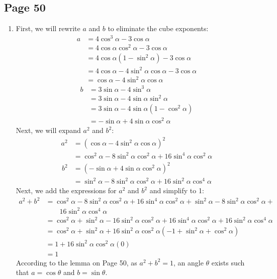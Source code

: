 \documentclass{article}
\newenvironment{solutions}[1]
{\subsection*{#1}
 \begin{enumerate}[leftmargin=1.5em]}
{\end{enumerate}}
\newcommand{\solution}{\item}
\begin{document}
\begin{solutions}{Page 50}
\solution %
First, we will rewrite $a$ and $b$ to eliminate the cube exponents:
\begin{align*}
a &= 4\cos^{3}{\alpha} - 3\cos{\alpha} \\
&= 4\cos{\alpha}\cos^{2}{\alpha} - 3\cos{\alpha} \\
&= 4\cos{\alpha}(1 - \sin^{2}{\alpha}) - 3\cos{\alpha} \\
&= 4\cos{\alpha} - 4\sin^{2}{\alpha}\cos{\alpha} - 3\cos{\alpha} \\
&= \cos{\alpha} - 4\sin^{2}{\alpha}\cos{\alpha}
\end{align*}
\begin{align*}
b &= 3\sin{\alpha} - 4\sin^{3}{\alpha} \\
&= 3\sin{\alpha} - 4\sin{\alpha}\sin^{2}{\alpha} \\
&= 3\sin{\alpha} - 4\sin{\alpha}(1 - \cos^{2}{\alpha}) \\
&= -\sin{\alpha} + 4\sin{\alpha}\cos^{2}{\alpha}
\end{align*}
Next, we will expand $a^2$ and $b^2$:
\begin{align*}
a^2 &= (\cos{\alpha} - 4\sin^{2}{\alpha}\cos{\alpha})^2 \\
&= \cos^{2}{\alpha} - 8\sin^{2}{\alpha}\cos^{2}{\alpha} + 16\sin^{4}{\alpha}\cos^{2}{\alpha}
\end{align*}
\begin{align*}
b^2 &= (-\sin{\alpha} + 4\sin{\alpha}\cos^{2}{\alpha})^2 \\
&= \sin^{2}{\alpha} - 8\sin^{2}{\alpha}\cos^{2}{\alpha} + 16\sin^{2}{\alpha}\cos^{4}{\alpha}
\end{align*}
Next, we add the expressions for $a^2$ and $b^2$ and simplify to 1:
\begin{align*}
a^2 + b^2 &= \cos^{2}{\alpha} - 8\sin^{2}{\alpha}\cos^{2}{\alpha} + 16\sin^{4}{\alpha}\cos^{2}{\alpha} +\sin^{2}{\alpha} - 8\sin^{2}{\alpha}\cos^{2}{\alpha} + \\
&\quad\quad16\sin^{2}{\alpha}\cos^{4}{\alpha} \\
&= \cos^{2}{\alpha} + \sin^{2}{\alpha} - 16\sin^{2}{\alpha}\cos^{2}{\alpha} + 16\sin^{4}{\alpha}\cos^{2}{\alpha} + 16\sin^{2}{\alpha}\cos^{4}{\alpha} \\
&= \cos^{2}{\alpha} + \sin^{2}{\alpha} + 16\sin^{2}{\alpha}\cos^{2}{\alpha}(-1 + \sin^{2}{\alpha} + \cos^{2}{\alpha}) \\
&= 1 + 16\sin^{2}{\alpha}\cos^{2}{\alpha}(0) \\
&= 1
\end{align*}
According to the lemma on Page 50, as $a^2 + b^2 = 1$, an angle $\theta$ exists such that $a = \cos{\theta}$ and $b = \sin{\theta}$.


\end{solutions}
\end{document}
